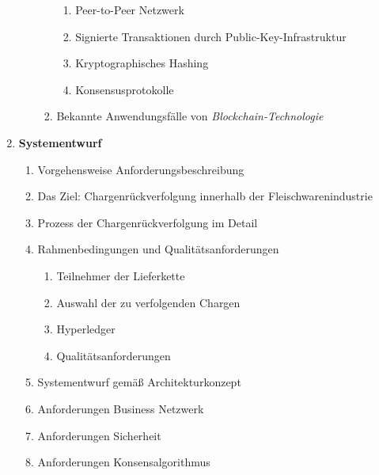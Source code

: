 \begin{small}
\begin{enumerate}
\begin{enumerate}[label*=\arabic*.]
\begin{enumerate}[label*=\arabic*.]
        \begin{enumerate}[label*=\arabic*.]
          \item Peer-to-Peer Netzwerk
          \item Signierte Transaktionen durch Public-Key-Infrastruktur
          \item Kryptographisches Hashing
          \item Konsensusprotokolle
        \end{enumerate}
        \item Bekannte Anwendungsfälle von \textit{Blockchain-Technologie}
      \end{enumerate}
    \end{enumerate}
    \item \textbf{Systementwurf}
    \begin{enumerate}[label*=\arabic*.]
      \item Vorgehensweise Anforderungsbeschreibung
      \item Das Ziel: Chargenrückverfolgung innerhalb der Fleischwarenindustrie
      \item Prozess der Chargenrückverfolgung im Detail
      \item Rahmenbedingungen und Qualitätsanforderungen
      \begin{enumerate}[label*=\arabic*.]
        \item Teilnehmer der Lieferkette
        \item Auswahl der zu verfolgenden Chargen
        \item Hyperledger
        \item Qualitätsanforderungen
      \end{enumerate}
      \item Systementwurf gemäß Architekturkonzept
      \item Anforderungen Business Netzwerk
      \item Anforderungen Sicherheit
      \item Anforderungen Konsensalgorithmus

\end{enumerate}
\end{enumerate}
\end{small}

